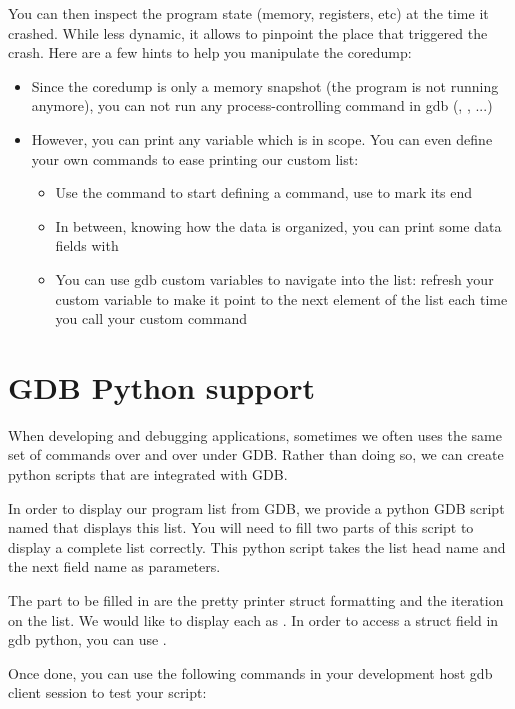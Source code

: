 You can then inspect the program state (memory, registers, etc) at the time it
crashed. While less dynamic, it allows to pinpoint the place that triggered the
crash. Here are a few hints to help you manipulate the coredump:
\begin{itemize}
  \item Since the coredump is only a memory snapshot (the program is not
  running anymore), you can not run any process-controlling command in gdb
  (, , ...)
  \item However, you can print any variable which is in scope. You can even
  define your own commands to ease printing our custom list:
  \begin{itemize}
    \item Use the  command to start defining a command, use
     to mark its end
    \item In between, knowing how the data is organized, you can print some
    data fields with 
    \item You can use gdb custom variables to navigate into the list: refresh
    your custom variable to make it point to the next element of the list each
    time you call your custom command
  \end{itemize}
\end{itemize}

\section{GDB Python support}

When developing and debugging applications, sometimes we often uses the same
set of commands over and over under GDB. Rather than doing so, we can create
python scripts that are integrated with GDB.

In order to display our program list from GDB, we provide a python GDB script
named  that displays this list. You will need to fill two
parts of this script to display a complete list correctly. This python script
takes the list head name and the next field name as parameters.

The part to be filled in are the pretty printer struct formatting and the
iteration on the list. We would like to display each  as
. In order to access a struct field in gdb python, you can use
.

Once done, you can use the following commands in your development host gdb
client session to test your script:

